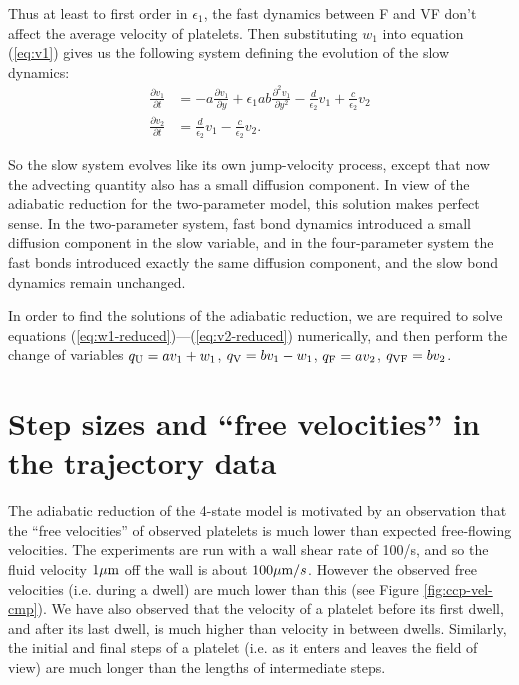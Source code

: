 \documentclass{article}
\newcommand{\tn}{\textnormal}
\newcommand{\Pder}[2]{\frac{\partial #1}{\partial #2}}
\begin{document}
Thus at least to first order in $\epsilon_1$, the fast dynamics
between F and VF don't affect the average velocity of platelets. Then
substituting $w_1$ into equation (\ref{eq:v1}) gives us the following
system defining the evolution of the slow dynamics:
\begin{align}
  \label{eq:v1-reduced}
  \Pder{v_1}{t} &= -a \Pder{v_1}{y} + \epsilon_1 a b \frac{\partial^2
                  v_1}{\partial y^2} - \frac{d}{\epsilon_2} v_1 +
                  \frac{c}{\epsilon_2} v_2 \\
  \label{eq:v2-reduced}
  \Pder{v_2}{t} &= \frac{d}{\epsilon_2} v_1 - \frac{c}{\epsilon_2} v_2.
\end{align}

So the slow system evolves like its own jump-velocity process, except
that now the advecting quantity also has a small diffusion
component. In view of the adiabatic reduction for the two-parameter
model, this solution makes perfect sense. In the two-parameter system,
fast bond dynamics introduced a small diffusion component in the slow
variable, and in the four-parameter system the fast bonds introduced
exactly the same diffusion component, and the slow bond dynamics
remain unchanged.

In order to find the solutions of the adiabatic reduction, we are
required to solve equations
(\ref{eq:w1-reduced})---(\ref{eq:v2-reduced}) numerically, and then
perform the change of variables $q_\tn{U} = a v_1 + w_1$, $q_\tn{V} =
b v_1 - w_1$, $q_\tn{F} = a v_2$, $q_\tn{VF} = b v_2$.

\section{Step sizes and ``free velocities'' in the trajectory data}
\label{sec:an-exam-traj}

The adiabatic reduction of the 4-state model is motivated by an
observation that the ``free velocities'' of observed platelets is much
lower than expected free-flowing velocities. The experiments are run
with a wall shear rate of 100/s, and so the fluid velocity
$1 \mu\tn{m}$ off the wall is about $100 \mu\tn{m}/s$. However the
observed free velocities (i.e. during a dwell) are much lower than
this (see Figure \ref{fig:ccp-vel-cmp}). We have also observed that
the velocity of a platelet before its first dwell, and after its last
dwell, is much higher than velocity in between dwells. Similarly, the
initial and final steps of a platelet (i.e. as it enters and leaves
the field of view) are much longer than the lengths of intermediate
steps. 
\end{document}
